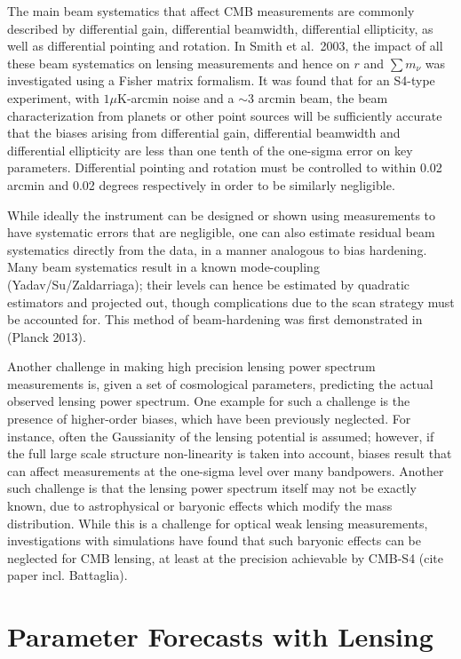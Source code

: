 The main beam systematics that affect CMB measurements are commonly described by differential gain, differential beamwidth, differential ellipticity, as well as differential pointing and rotation. In Smith et al.~2003, the impact of all these beam systematics on lensing measurements and hence on $r$ and $\sum m_\nu$ was investigated using a Fisher matrix formalism. It was found that for an S4-type experiment, with $1 \mu $K-arcmin noise and a $\sim 3$ arcmin beam, the beam characterization from planets or other point sources will be sufficiently accurate that the biases arising from differential gain, differential beamwidth and differential ellipticity are less than one tenth of the one-sigma error on key parameters. Differential pointing and rotation must be controlled to within 0.02 arcmin and 0.02 degrees respectively in order to be similarly negligible.

While ideally the instrument can be designed or shown using measurements to have systematic errors that are negligible, one can also estimate residual beam systematics directly from the data, in a manner analogous to bias hardening. Many beam systematics result in a known mode-coupling (Yadav/Su/Zaldarriaga); their levels can hence be estimated by quadratic estimators and projected out, though complications due to the scan strategy must be accounted for. This method of beam-hardening was first demonstrated in (Planck 2013).

Another challenge in making high precision lensing power spectrum measurements is, given a set of cosmological parameters, predicting the actual observed lensing power spectrum. One example for such a challenge is the presence of higher-order biases, which have been previously neglected. For instance, often the Gaussianity of the lensing potential is assumed; however, if the full large scale structure non-linearity is taken into account, biases result that can affect measurements at the one-sigma level over many bandpowers. Another such challenge is that the lensing power spectrum itself may not be exactly known, due to astrophysical or baryonic effects which modify the mass distribution. While this is a challenge for optical weak lensing measurements, investigations with simulations have found that such baryonic effects can be neglected for CMB lensing, at least at the precision achievable by CMB-S4 (cite paper incl. Battaglia).


\section{Parameter Forecasts with Lensing}\label{forecasts}

